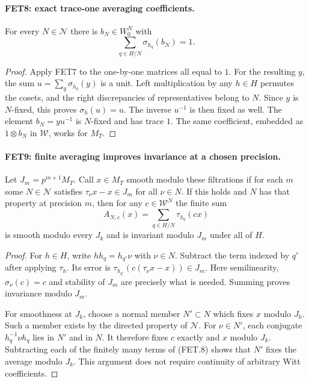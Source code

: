 \paragraph{FET8: exact trace-one averaging coefficients.}
\label{claim:FET8}
For every $N\in\mathcal N$ there is $b_N\in W_0^N$ with
\[
                      \sum_{q\in H/N}\sigma_{h_q}(b_N)=1.
                                                               \tag{FET.7}
\]

\begin{proof}
Apply FET7 to the one-by-one matrices all equal to $1$.
For the resulting $y$, the sum $u=\sum_q\sigma_{h_q}(y)$ is
a unit. Left multiplication by any $h\in H$ permutes the cosets,
and the right discrepancies of representatives belong to $N$.
Since $y$ is $N$-fixed, this proves $\sigma_h(u)=u$.
The inverse $u^{-1}$ is then fixed as well.
The element $b_N=yu^{-1}$ is $N$-fixed and has trace $1$.
The same coefficient, embedded as $1\otimes b_N$ in
$\mathcal W$, works for $M_T$.
\end{proof}

\paragraph{FET9: finite averaging improves invariance at a chosen precision.}
\label{claim:FET9}
Let $J_m=p^{m+1}M_T$. Call $x\in M_T$ smooth modulo these
filtrations if for each $m$ some $N\in\mathcal N$ satisfies
$\tau_\nu x-x\in J_m$ for all $\nu\in N$.
If this holds and $N$ has that property at precision $m$, then
for any $c\in\mathcal W^N$ the finite sum
\[
                    A_{N,c}(x)=\sum_{q\in H/N}\tau_{h_q}(cx)
                                                               \tag{FET.8}
\]
is smooth modulo every $J_k$ and is invariant modulo $J_m$
under all of $H$.

\begin{proof}
For $h\in H$, write $hh_q=h_{q'}\nu$ with $\nu\in N$.
Subtract the term indexed by $q'$ after applying $\tau_h$.
Its error is $\tau_{h_{q'}}(c(\tau_\nu x-x))\in J_m$.
Here semilinearity, $\sigma_\nu(c)=c$ and stability of $J_m$
are precisely what is needed. Summing proves invariance modulo
$J_m$.

For smoothness at $J_k$, choose a normal member $N'\subset N$
which fixes $x$ modulo $J_k$. Such a member exists by the
directed property of $\mathcal N$. For $\nu\in N'$, each
conjugate $h_q^{-1}\nu h_q$ lies in $N'$ and in $N$.
It therefore fixes $c$ exactly and $x$ modulo $J_k$.
Subtracting each of the finitely many terms of (FET.8) shows
that $N'$ fixes the average modulo $J_k$. This argument does
not require continuity of arbitrary Witt coefficients.
\end{proof}

